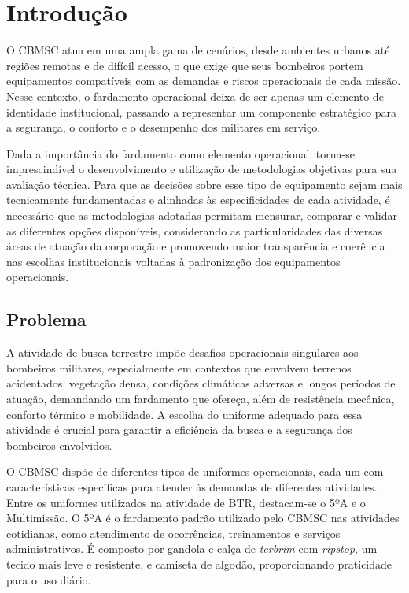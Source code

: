 \chapter{Introdução}



	    O \acrfull{CBMSC} atua em uma ampla gama de cenários, desde ambientes urbanos até 
		regiões remotas e de difícil acesso, o que exige que seus bombeiros portem equipamentos 
		compatíveis com as demandas e riscos operacionais de cada missão. Nesse contexto, o 
		fardamento operacional deixa de ser apenas um elemento de identidade institucional, passando 
		a representar um componente estratégico para a segurança, o conforto e o desempenho dos 
		militares em serviço.

    	Dada a importância do fardamento como elemento operacional, torna-se imprescindível o 
		desenvolvimento e utilização de metodologias objetivas para sua avaliação técnica. 
		Para que as decisões sobre esse tipo de equipamento sejam mais tecnicamente fundamentadas e 
		alinhadas às especificidades de cada atividade, é necessário que as metodologias adotadas 
		permitam mensurar, comparar e validar as diferentes opções disponíveis, considerando as 
		particularidades das diversas áreas de atuação da corporação e promovendo maior transparência 
		e coerência nas escolhas institucionais voltadas à padronização dos equipamentos operacionais.

	\section{Problema}

		A atividade de busca terrestre impõe desafios operacionais singulares aos bombeiros militares,
		 especialmente em contextos que envolvem terrenos acidentados, vegetação densa, condições climáticas 
		 adversas e longos períodos de atuação, demandando um fardamento que ofereça, além de resistência mecânica, conforto térmico e mobilidade.  
		A escolha do uniforme adequado para essa atividade é crucial para garantir a eficiência da busca e a segurança dos bombeiros envolvidos.

		O \acrshort{CBMSC} dispõe de diferentes tipos de uniformes operacionais, cada um com características específicas para atender
		às demandas de diferentes atividades.  Entre os uniformes utilizados na atividade de \acrfull{BTR}, destacam-se o 5ºA e o Multimissão.
		O 5ºA é o fardamento padrão utilizado pelo \acrshort{CBMSC} nas atividades cotidianas, como atendimento de ocorrências,
		treinamentos e serviços administrativos. É composto por gandola e calça de \textit{terbrim} com \textit{ripstop}, um tecido mais leve e 
		resistente, e camiseta de algodão, proporcionando praticidade para o uso diário.

